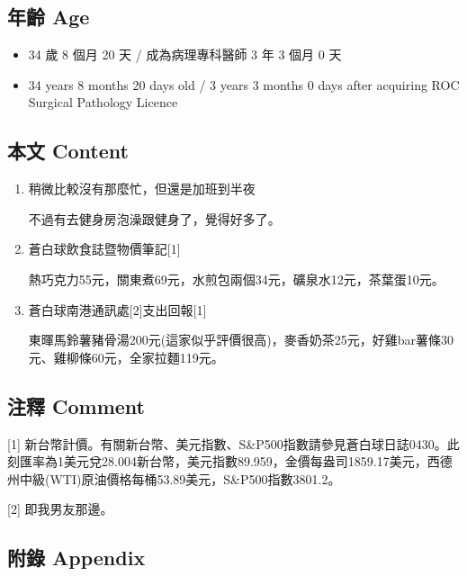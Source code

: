 \documentclass[
]{article}
\providecommand{\tightlist}{%
  \setlength{\itemsep}{0pt}\setlength{\parskip}{0pt}}
\begin{document}
\hypertarget{ux5e74ux9f61-age-11}{%
\subsection{年齡 Age}\label{ux5e74ux9f61-age-11}}

\begin{itemize}
\tightlist
\item
  34 歲 8 個月 20 天 / 成為病理專科醫師 3 年 3 個月 0 天
\item
  34 years 8 months 20 days old / 3 years 3 months 0 days after
  acquiring ROC Surgical Pathology Licence
\end{itemize}

\hypertarget{ux672cux6587-content-11}{%
\subsection{本文 Content}\label{ux672cux6587-content-11}}

\begin{enumerate}
\def\labelenumi{\arabic{enumi}.}
\item
  稍微比較沒有那麼忙，但還是加班到半夜

  不過有去健身房泡澡跟健身了，覺得好多了。
\item
  蒼白球飲食誌暨物價筆記{[}1{]}

  熱巧克力55元，關東煮69元，水煎包兩個34元，礦泉水12元，茶葉蛋10元。
\item
  蒼白球南港通訊處{[}2{]}支出回報{[}1{]}

  東暉馬鈴薯豬骨湯200元(這家似乎評價很高)，麥香奶茶25元，好雞bar薯條30元、雞柳條60元，全家拉麵119元。
\end{enumerate}

\hypertarget{ux6ce8ux91cb-comment-11}{%
\subsection{注釋 Comment}\label{ux6ce8ux91cb-comment-11}}

{[}1{]}
新台幣計價。有關新台幣、美元指數、S\&P500指數請參見蒼白球日誌0430。此刻匯率為1美元兌28.004新台幣，美元指數89.959，金價每盎司1859.17美元，西德州中級(WTI)原油價格每桶53.89美元，S\&P500指數3801.2。

{[}2{]} 即我男友那邊。

\hypertarget{ux9644ux9304-appendix-11}{%
\subsection{附錄 Appendix}\label{ux9644ux9304-appendix-11}}
\end{document}
